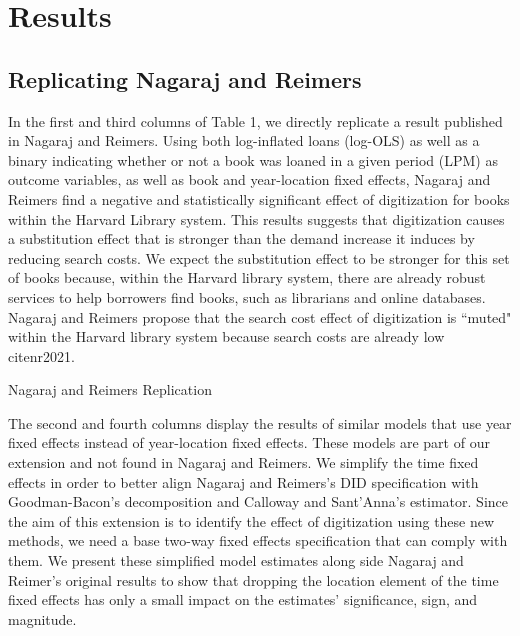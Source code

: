\documentclass{article}
\begin{document}
\section{Results}
\subsection{Replicating Nagaraj and Reimers}

In the first and third columns of Table 1, we directly replicate a result published in Nagaraj and Reimers. Using both log-inflated loans (log-OLS) as well as a binary indicating whether or not a book was loaned in a given period (LPM) as outcome variables, as well as book and year-location fixed effects, Nagaraj and Reimers find a negative and statistically significant effect of digitization for books within the Harvard Library system. This results suggests that digitization causes a substitution effect that is stronger than the demand increase it induces by reducing search costs. We expect the substitution effect to be stronger for this set of books because, within the Harvard library system, there are already robust services to help borrowers find books, such as librarians and online databases. Nagaraj and Reimers propose that the search cost effect of digitization is ``muted" within the Harvard library system because search costs are already low cite{nr2021}. 

\begin{table}[htbp]
   \centering
   \caption{Nagaraj and Reimers Replication}
  
   \label{tab:booktabs}
\end{table}

The second and fourth columns display the results of similar models that use year fixed effects instead of year-location fixed effects. These models are part of our extension and not found in Nagaraj and Reimers. We simplify the time fixed effects in order to better align Nagaraj and Reimers's DID specification with Goodman-Bacon's decomposition and Calloway and Sant'Anna's estimator. Since the aim of this extension is to identify the effect of digitization using these new methods, we need a base two-way fixed effects specification that can comply with them. We present these simplified model estimates along side Nagaraj and Reimer's original results to show that dropping the location element of the time fixed effects has only a small impact on the estimates' significance, sign, and magnitude.
\end{document}
